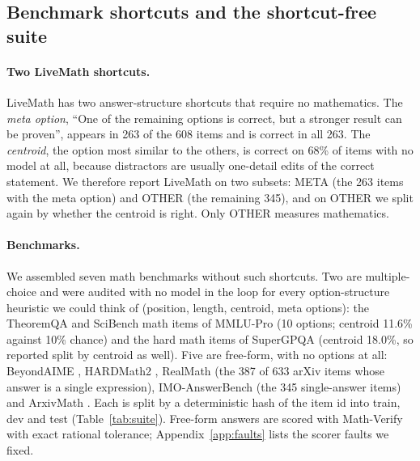 \documentclass[11pt]{article}
\begin{document}
\subsection{Benchmark shortcuts and the shortcut-free suite}
\label{sec:suite}

\paragraph{Two LiveMath shortcuts.} LiveMath has two answer-structure shortcuts that require no
mathematics. The \emph{meta option}, ``One of the remaining options is correct, but a stronger
result can be proven'', appears in 263 of the 608 items and is correct in all 263. The
\emph{centroid}, the option most similar to the others, is correct on 68\% of items with no model at
all, because distractors are usually one-detail edits of the correct statement. We therefore report
LiveMath on two subsets: META (the 263 items with the meta option) and OTHER (the remaining 345),
and on OTHER we split again by whether the centroid is right. Only OTHER measures mathematics.

\paragraph{Benchmarks.} We assembled seven math benchmarks without such shortcuts.
Two are multiple-choice and were audited with no model in the loop for every option-structure
heuristic we could think of (position, length, centroid, meta options): the TheoremQA and SciBench
math items of MMLU-Pro \citep{wang2024mmlupro} (10 options; centroid 11.6\% against 10\% chance) and
the hard math items of SuperGPQA \citep{supergpqa2025} (centroid 18.0\%, so reported split by
centroid as well). Five are free-form, with no options at all: BeyondAIME \citep{beyondaime2025},
HARDMath2 \citep{roggeveen2025hardmath2}, RealMath \citep{zhang2025realmath} (the 387 of 633
arXiv items whose answer is a single expression), IMO-AnswerBench \citep{luong2025imobench} (the 345
single-answer items) and ArxivMath \citep{balunovic2025matharena}. Each is split by a deterministic
hash of the item id into train, dev and test (Table~\ref{tab:suite}). Free-form answers are scored
with Math-Verify \citep{mathverify} with exact rational tolerance; Appendix~\ref{app:faults} lists the
scorer faults we fixed.
\end{document}
